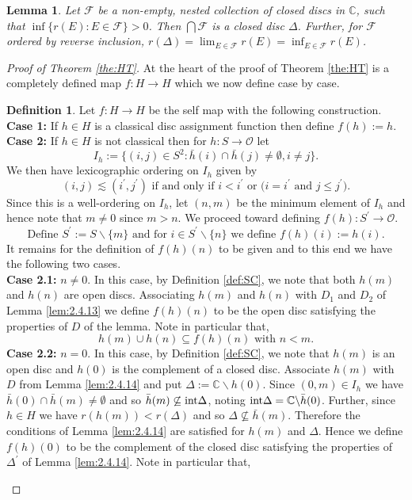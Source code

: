 \documentclass{strippedproc-l}
\newtheorem{lemma}[theorem]{Lemma}
\theoremstyle{definition}
\newtheorem{definition}[theorem]{Definition}
\theoremstyle{remark}
\numberwithin{equation}{section}
\begin{document}
\begin{lemma}
Let $\mathcal{F}$ be a non-empty, nested collection of closed discs in $\mathbb{C}$, such that $\inf\{r(E):E\in\mathcal{F}\}>0$. Then $\bigcap\mathcal{F}$ is a closed disc $\Delta$. Further, for $\mathcal{F}$ ordered by reverse inclusion, $r(\Delta)=\lim_{E\in\mathcal{F}}r(E)=\inf_{E\in\mathcal{F}}r(E)$.
\label{lem:2.4.12}
\end{lemma}
\begin{proof}[Proof of Theorem \ref{the:HT}]
At the heart of the proof of Theorem \ref{the:HT} is a completely defined map $f:H\rightarrow H$ which we now define case by case.
\begin{definition}
Let $f:H\rightarrow H$ be the self map with the following construction.\\
{\bf{Case 1:}} If $h\in H$ is a classical disc assignment function then define $f(h):=h$.\\
{\bf{Case 2:}} If $h\in H$ is not classical then for $h:S\rightarrow\mathcal{O}$ let
\begin{equation*}
I_{h}:=\{(i,j)\in S^{2}:\bar{h}(i)\cap\bar{h}(j)\not=\emptyset, i\not= j\}.
\end{equation*}
We then have lexicographic ordering on $I_{h}$ given by 
\begin{equation*}
(i,j)\lesssim(i^{'},j^{'})\mbox{ if and only if $i<i^{'}$ or ($i=i^{'}$ and $j\le j^{'}$).}
\end{equation*}
Since this is a well-ordering on $I_{h}$, let $(n,m)$ be the minimum element of $I_{h}$ and hence note that $m\not= 0$ since $m>n$. We proceed toward defining $f(h):S^{'}\rightarrow\mathcal{O}$. 
\begin{equation*}
\mbox{Define $S^{'}:=S\backslash\{m\}$ and for $i\in S^{'}\backslash\{n\}$ we define $f(h)(i):=h(i)$.}
\end{equation*}
It remains for the definition of $f(h)(n)$ to be given and to this end we have the following two cases.\\ 
{\bf{Case 2.1:}} $n\not=0$. In this case, by Definition \ref{def:SC}, we note that both $h(m)$ and $h(n)$ are open discs. Associating $h(m)$ and $h(n)$ with $D_{1}$ and $D_{2}$ of Lemma \ref{lem:2.4.13} we define $f(h)(n)$ to be the open disc satisfying the properties of $D$ of the lemma. Note in particular that,
\begin{equation}
h(m)\cup h(n)\subseteq f(h)(n)\mbox{ with }n<m.
\label{equ:sset1}
\end{equation}
{\bf{Case 2.2:}} $n=0$. In this case, by Definition \ref{def:SC}, we note that $h(m)$ is an open disc and $h(0)$ is the complement of a closed disc. Associate $h(m)$ with $D$ from Lemma \ref{lem:2.4.14} and put $\Delta :=\mathbb{C}\backslash h(0)$. Since $(0,m)\in I_{h}$ we have $\bar{h}(0)\cap\bar{h}(m)\not=\emptyset$ and so $\bar{h}(m)\not\subseteq\mbox{\textup{int}}\Delta$, noting $\mbox{\textup{int}}\Delta=\mathbb{C}\backslash\bar{h}(0)$. Further, since $h\in H$ we have $r(h(m))<r(\Delta)$ and so $\Delta\not\subseteq\bar{h}(m)$. Therefore the conditions of Lemma \ref{lem:2.4.14} are satisfied for $h(m)$ and $\Delta$. Hence we define $f(h)(0)$ to be the complement of the closed disc satisfying the properties of $\Delta^{'}$ of Lemma \ref{lem:2.4.14}. Note in particular that,

\end{definition}
\end{proof}
\end{document}
